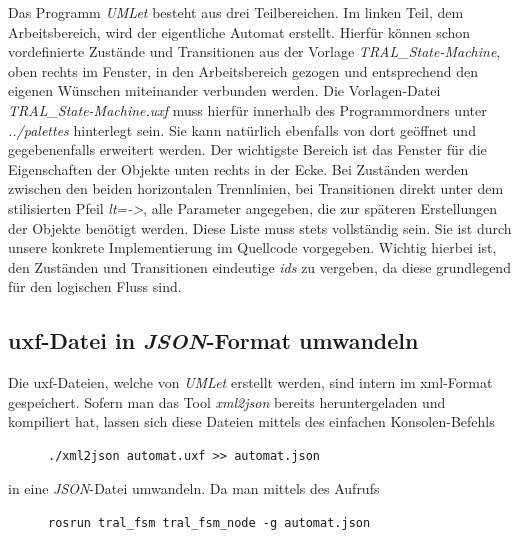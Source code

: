 Das Programm \textit{UMLet} besteht aus drei Teilbereichen. Im linken Teil, dem
Arbeitsbereich, wird der eigentliche Automat erstellt. Hierfür können schon
vordefinierte Zustände und Transitionen aus der Vorlage \textit{TRAL\_State-Machine},
oben rechts im Fenster, in den Arbeitsbereich gezogen und entsprechend den eigenen Wünschen
miteinander verbunden werden. Die Vorlagen-Datei \textit{TRAL\_State-Machine.uxf} muss
hierfür innerhalb des Programmordners unter \textit{../palettes} hinterlegt sein.
Sie kann natürlich ebenfalls von dort geöffnet und gegebenenfalls erweitert
werden.
Der wichtigste Bereich ist das Fenster für die Eigenschaften der Objekte unten rechts in der Ecke.
Bei Zuständen werden zwischen den beiden horizontalen Trennlinien, bei
Transitionen direkt unter dem stilisierten Pfeil \textit{lt=->}, alle Parameter
angegeben, die zur späteren Erstellungen der Objekte benötigt werden. Diese
Liste muss stets vollständig sein. Sie ist durch unsere konkrete
Implementierung im Quellcode vorgegeben.
Wichtig hierbei ist, den Zuständen und Transitionen eindeutige \textit{ids} zu
vergeben, da diese grundlegend für den logischen Fluss sind.


\subsection{uxf-Datei in \textit{JSON}-Format umwandeln}
Die uxf-Dateien, welche von \textit{UMLet} erstellt werden, sind intern im xml-Format
gespeichert. Sofern man das Tool \textit{xml2json} bereits heruntergeladen und
kompiliert hat, lassen sich diese Dateien mittels des einfachen Konsolen-Befehls

\begin{figure}[thp]
\begin{lstlisting}[style=json]
./xml2json automat.uxf >> automat.json

\end{lstlisting}
\centering
\end{figure}

in eine \textit{JSON}-Datei umwandeln.
Da man mittels des Aufrufs
 
\begin{figure}[thp]
\begin{lstlisting}[style=json]
rosrun tral_fsm tral_fsm_node -g automat.json
\end{lstlisting}
\centering
\end{figure}

